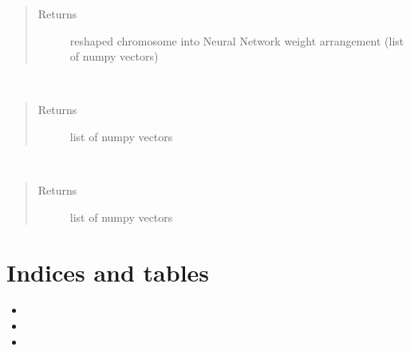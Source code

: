 \documentclass[letterpaper,10pt,english]{sphinxmanual}
\begin{document}
\begin{fulllineitems}
\begin{fulllineitems}
\begin{quote}
\begin{description}
\item[{Returns}] \leavevmode
reshaped chromosome into Neural Network weight arrangement (list of numpy vectors)

\end{description}\end{quote}

\end{fulllineitems}


\begin{fulllineitems}
\label{\detokenize{index:genetic_optimizer.GeneticRegularizator.weights_to_vector}}~\begin{quote}\begin{description}
\item[{Returns}] \leavevmode
list of numpy vectors

\end{description}\end{quote}

\end{fulllineitems}


\begin{fulllineitems}
\label{\detokenize{index:genetic_optimizer.GeneticRegularizator.weights_to_vector2}}~\begin{quote}\begin{description}
\item[{Returns}] \leavevmode
list of numpy vectors

\end{description}\end{quote}

\end{fulllineitems}


\end{fulllineitems}



\chapter{Indices and tables}
\label{\detokenize{index:indices-and-tables}}\begin{itemize}
\item {} 

\item {} 

\item {} 

\end{itemize}
\end{document}
